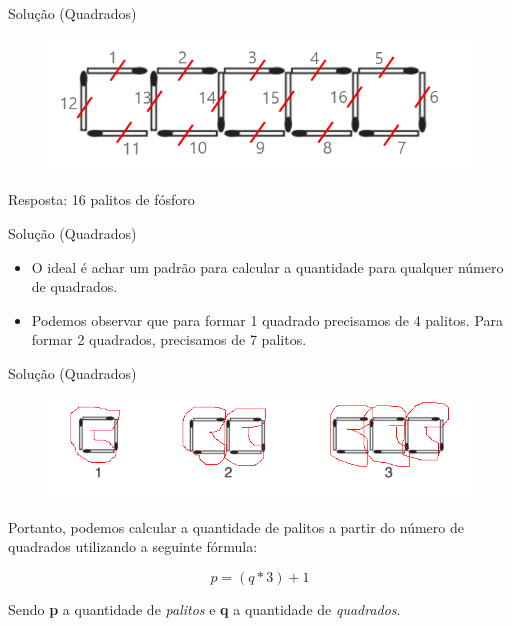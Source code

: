 \documentclass{beamer}
\begin{document}
\begin{frame}{Solução (Quadrados)}
 
\begin{figure}[ht]
\centering
\includegraphics[width=.7\textwidth]{solucao.png}
\label{fig:exampleFig2}
\end{figure}
Resposta: 16 palitos de fósforo \\
\end{frame}


\begin{frame}{Solução (Quadrados)}
\begin{itemize}
\item O ideal é achar um padrão para calcular a quantidade para qualquer número de quadrados.
\item Podemos observar que para formar 1 quadrado precisamos de 4 palitos. Para formar 2 quadrados, precisamos de 7 palitos. 
\end{itemize}
\end{frame}

\begin{frame}{Solução (Quadrados)}


\begin{figure}[ht]
\centering
\includegraphics[width=.6\textwidth]{q2.png}
\label{fig:exampleFig2}
\end{figure}

Portanto, podemos calcular a quantidade de palitos a partir do número de quadrados utilizando a seguinte fórmula: 

\begin{equation*}
    p = (q \ast 3) + 1
\end{equation*}

Sendo \textbf{p} a quantidade de \textit{palitos} e \textbf{q} a quantidade de \textit{quadrados}.
\end{frame}
\end{document}
